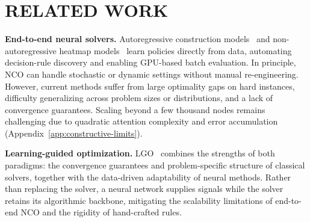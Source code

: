 \documentclass[sigconf]{acmart}
\begin{document}
\section{RELATED WORK}
\label{sec:related-nco}


\smallskip\noindent\textbf{End-to-end neural solvers.}
Autoregressive construction models~\cite{pointernetwork,attentionmodel,pomo} and non-autoregressive heatmap models~\cite{bq,lehd,invit,sigd,l2c} learn policies directly from data, automating decision-rule discovery and enabling GPU-based batch evaluation.
In principle, NCO can handle stochastic or dynamic settings without manual re-engineering.
However, current methods suffer from large optimality gaps on hard instances, difficulty generalizing across problem sizes or distributions, and a lack of convergence guarantees.
Scaling beyond a few thousand nodes remains challenging due to quadratic attention complexity and error accumulation (Appendix~\ref{app:constructive-limits}).

\smallskip\noindent\textbf{Learning-guided optimization.}
LGO~\cite{learn2branch,learn2delegate, learn2optimize, 2optlearning, neuopt, neurolkh} combines the strengths of both paradigms: the convergence guarantees and problem-specific structure of classical solvers, together with the data-driven adaptability of neural methods.
Rather than replacing the solver, a neural network supplies signals while the solver retains its algorithmic backbone, mitigating the scalability limitations of end-to-end NCO and the rigidity of hand-crafted rules. 
\end{document}
